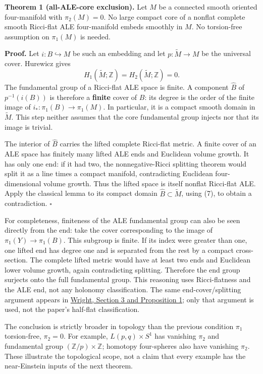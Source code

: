 \documentclass[
  11pt,
]{article}
\begin{document}
\textbf{Theorem 1 (all-ALE-core exclusion).} Let \(M\) be a connected
smooth oriented four-manifold with \(\pi_2(M)=0\). No large compact core
of a nonflat complete smooth Ricci-flat ALE four-manifold embeds
smoothly in \(M\). No torsion-free assumption on \(\pi_1(M)\) is needed.

\textbf{Proof.} Let \(i:B\hookrightarrow M\) be such an embedding and
let \(p:\widetilde M\to M\) be the universal cover. Hurewicz gives \[
 H_1(\widetilde M;\mathbb Z)=H_2(\widetilde M;\mathbb Z)=0.
 \tag{7}
\] The fundamental group of a Ricci-flat ALE space is finite. A
component \(\widehat B\) of \(p^{-1}(i(B))\) is therefore a
\textbf{finite} cover of \(B\): its degree is the order of the finite
image of \(i_*:\pi_1(B)\to\pi_1(M)\). In particular, it is a compact
smooth domain in \(\widetilde M\). This step neither assumes that the
core fundamental group injects nor that its image is trivial.

The interior of \(\widehat B\) carries the lifted complete Ricci-flat
metric. A finite cover of an ALE space has finitely many lifted ALE ends
and Euclidean volume growth. It has only one end: if it had two, the
nonnegative-Ricci splitting theorem would split it as a line times a
compact manifold, contradicting Euclidean four-dimensional volume
growth. Thus the lifted space is itself nonflat Ricci-flat ALE. Apply
the classical lemma to its compact domain
\(\widehat B\subset\widetilde M\), using (7), to obtain a contradiction.
\(\square\)

For completeness, finiteness of the ALE fundamental group can also be
seen directly from the end: take the cover corresponding to the image of
\(\pi_1(Y)\to\pi_1(B)\). This subgroup is finite. If its index were
greater than one, one lifted end has degree one and is separated from
the rest by a compact cross-section. The complete lifted metric would
have at least two ends and Euclidean lower volume growth, again
contradicting splitting. Therefore the end group surjects onto the full
fundamental group. This reasoning uses Ricci-flatness and the ALE end,
not any holonomy classification. The same end-cover/splitting argument
appears in \href{https://arxiv.org/html/1102.2442}{Wright, Section 3 and
Proposition 1}; only that argument is used, not the paper's half-flat
classification.

The conclusion is strictly broader in topology than the previous
condition \(\pi_1\) torsion-free, \(\pi_2=0\). For example,
\(L(p,q)\times S^1\) has vanishing \(\pi_2\) and fundamental group
\((\mathbb Z/p)\times\mathbb Z\); homotopy four-spheres also have
vanishing \(\pi_2\). These illustrate the topological scope, not a claim
that every example has the near-Einstein inputs of the next theorem.
\end{document}

